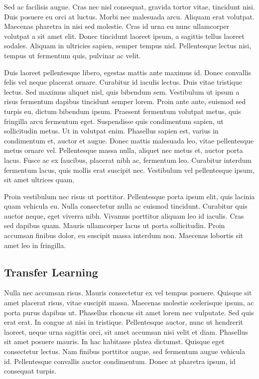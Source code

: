 Sed ac facilisis augue. Cras nec nisl consequat, gravida tortor vitae, tincidunt nisi. Duis posuere eu orci at luctus. Morbi nec malesuada arcu. Aliquam erat volutpat. Maecenas pharetra in nisi sed molestie. Cras id urna eu nunc ullamcorper volutpat a sit amet elit. Donec tincidunt laoreet ipsum, a sagittis tellus laoreet sodales. Aliquam in ultricies sapien, semper tempus nisl. Pellentesque lectus nisi, tempus ut fermentum quis, pulvinar ac velit.

Duis laoreet pellentesque libero, egestas mattis ante maximus id. Donec convallis felis vel neque placerat ornare. Curabitur id iaculis lectus. Duis vitae tristique lectus. Sed maximus aliquet nisl, quis bibendum sem. Vestibulum ut ipsum a risus fermentum dapibus tincidunt semper lorem. Proin ante ante, euismod sed turpis eu, dictum bibendum ipsum. Praesent fermentum volutpat metus, quis fringilla arcu fermentum eget. Suspendisse quis condimentum sapien, ut sollicitudin metus. Ut in volutpat enim. Phasellus sapien est, varius in condimentum et, auctor et augue. Donec mattis malesuada leo, vitae pellentesque metus ornare vel. Pellentesque massa nulla, aliquet nec metus et, auctor porta lacus. Fusce ac ex faucibus, placerat nibh ac, fermentum leo. Curabitur interdum fermentum lacus, quis mollis erat suscipit nec. Vestibulum vel pellentesque ipsum, sit amet ultrices quam.

Proin vestibulum nec risus ut porttitor. Pellentesque porta ipsum elit, quis lacinia quam vehicula eu. Nulla consectetur nulla ac euismod tincidunt. Curabitur quis auctor neque, eget viverra nibh. Vivamus porttitor aliquam leo id iaculis. Cras sed dapibus quam. Mauris ullamcorper lacus ut porta sollicitudin. Proin accumsan finibus dolor, eu suscipit massa interdum non. Maecenas lobortis sit amet leo in fringilla.

\subsection{Transfer Learning} %
\label{sub:amet}
Nulla nec accumsan risus. Mauris consectetur ex vel tempus posuere. Quisque sit amet placerat risus, vitae suscipit massa. Maecenas molestie scelerisque ipsum, ac porta purus dapibus ut. Phasellus rhoncus sit amet lorem nec vulputate. Sed quis erat erat. In congue at nisi in tristique. Pellentesque auctor, nunc ut hendrerit laoreet, neque urna sagittis orci, sit amet accumsan nisi velit et diam. Phasellus sit amet posuere mauris. In hac habitasse platea dictumst. Quisque eget consectetur lectus. Nam finibus porttitor augue, sed fermentum augue vehicula id. Pellentesque convallis auctor condimentum. Donec at pharetra ipsum, id consequat turpis.

